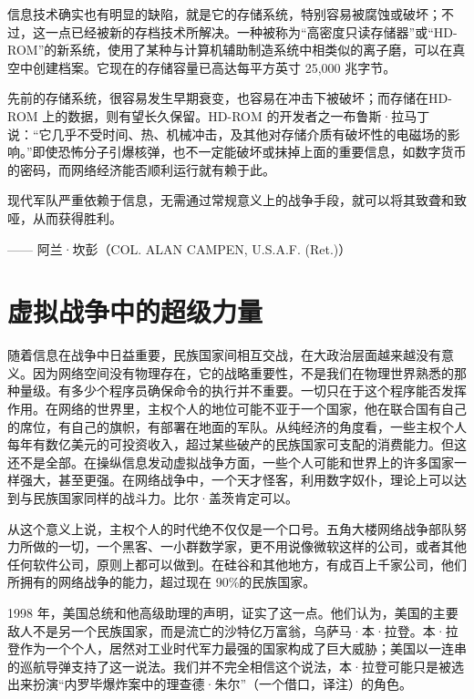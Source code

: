 信息技术确实也有明显的缺陷，就是它的存储系统，特别容易被腐蚀或破坏；不过，这一点已经被新的存档技术所解决。一种被称为“高密度只读存储器”或“HD-ROM”的新系统，使用了某种与计算机辅助制造系统中相类似的离子磨，可以在真空中创建档案。它现在的存储容量已高达每平方英寸 25,000 兆字节。

先前的存储系统，很容易发生早期衰变，也容易在冲击下被破坏；而存储在HD-ROM 上的数据，则有望长久保留。HD-ROM 的开发者之一布鲁斯·拉马丁说：“它几乎不受时间、热、机械冲击，及其他对存储介质有破坏性的电磁场的影响。”即使恐怖分子引爆核弹，也不一定能破坏或抹掉上面的重要信息，如数字货币的密码，而网络经济能否顺利运行就有赖于此。

\begin{tcolorbox}
现代军队严重依赖于信息，无需通过常规意义上的战争手段，就可以将其致聋和致哑，从而获得胜利。
\begin{flushright}
—— 阿兰·坎彭（COL. ALAN CAMPEN, U.S.A.F. (Ret.)）
\end{flushright}
\end{tcolorbox}


\section{虚拟战争中的超级力量}
随着信息在战争中日益重要，民族国家间相互交战，在大政治层面越来越没有意义。因为网络空间没有物理存在，它的战略重要性，不是我们在物理世界熟悉的那种量级。有多少个程序员确保命令的执行并不重要。一切只在于这个程序能否发挥作用。在网络的世界里，主权个人的地位可能不亚于一个国家，他在联合国有自己的席位，有自己的旗帜，有部署在地面的军队。从纯经济的角度看，一些主权个人每年有数亿美元的可投资收入，超过某些破产的民族国家可支配的消费能力。但这还不是全部。在操纵信息发动虚拟战争方面，一些个人可能和世界上的许多国家一样强大，甚至更强。在网络战争中，一个天才怪客，利用数字奴仆，理论上可以达到与民族国家同样的战斗力。比尔·盖茨肯定可以。

从这个意义上说，主权个人的时代绝不仅仅是一个口号。五角大楼网络战争部队努力所做的一切，一个黑客、一小群数学家，更不用说像微软这样的公司，或者其他任何软件公司，原则上都可以做到。在硅谷和其他地方，有成百上千家公司，他们所拥有的网络战争的能力，超过现在 90\%的民族国家。

1998 年，美国总统和他高级助理的声明，证实了这一点。他们认为，美国的主要敌人不是另一个民族国家，而是流亡的沙特亿万富翁，乌萨马·本·拉登。本·拉登作为一个个人，居然对工业时代军力最强的国家构成了巨大威胁；美国以一连串的巡航导弹支持了这一说法。我们并不完全相信这个说法，本·拉登可能只是被选出来扮演“内罗毕爆炸案中的理查德·朱尔”（一个借口，译注）的角色。

